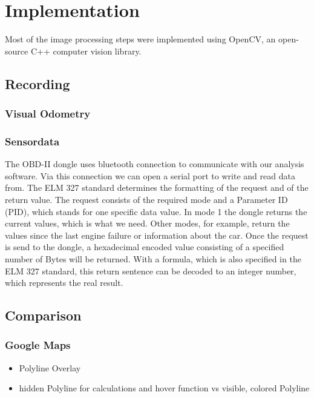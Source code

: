 \section{Implementation}
\label{sec:implementation}

Most of the image processing steps were implemented using OpenCV, an open-source C++ computer vision library. 

\subsection{Recording}
\subsubsection{Visual Odometry}
\subsubsection{Sensordata}
The OBD-II dongle uses bluetooth connection to communicate with our analysis software. Via this connection we can open a serial port to write and read data from.
The ELM 327 standard determines the formatting of the request and of the return value.
The request consists of the required mode and a Parameter ID (PID), which stands for one specific data value. In mode 1 the dongle returns the current values, which is what we need. Other modes, for example, return the values since the last engine failure or information about the car.
Once the request is send to the dongle, a hexadecimal encoded value consisting of a specified number of Bytes will be returned. With a formula, which is also specified in the ELM 327 standard, this return sentence can be decoded to an integer number, which represents the real result.

\subsection{Comparison}
\subsubsection{Google Maps}
\begin{itemize}
	\item Polyline Overlay
	\item hidden Polyline for calculations and hover function vs visible, colored Polyline	
\end{itemize}